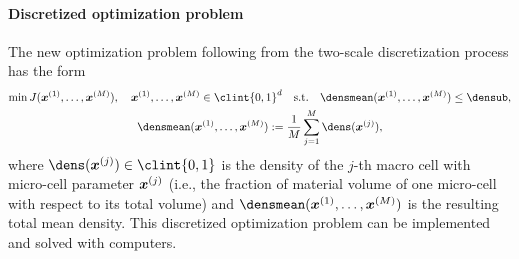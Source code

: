 \paragraph{Discretized optimization problem}

The new optimization problem following from the
two-scale discretization process has the form
\begin{subequations}
  \label{eq:topoOptProblemDiscrete}
  \begin{gather}
    \min J(\*x^{(1)}, \dotsc, \*x^{(M)}),\quad
    \*x^{(1)}, \dotsc, \*x^{(M)} \in \clint{0, 1}^d
    \quad\text{s.t.}\quad
    \densmean(\*x^{(1)}, \dotsc, \*x^{(M)}) \le \densub,\\
    \densmean(\*x^{(1)}, \dotsc, \*x^{(M)})
    := \frac{1}{M} \sum_{j=1}^M \dens(\*x^{(j)}),
  \end{gather}
\end{subequations}
where $\dens(\*x^{(j)}) \in \clint{0, 1}$ is the
density of the $j$-th macro cell with micro-cell parameter ${\boldsymbol{x}}^{(j)}$
(i.e., the fraction of material volume of one micro-cell
with respect to its total volume)
and $\densmean(\*x^{(1)}, \dotsc, \*x^{(M)})$ is the resulting
total mean density.
This discretized optimization problem can be implemented and
solved with computers.
